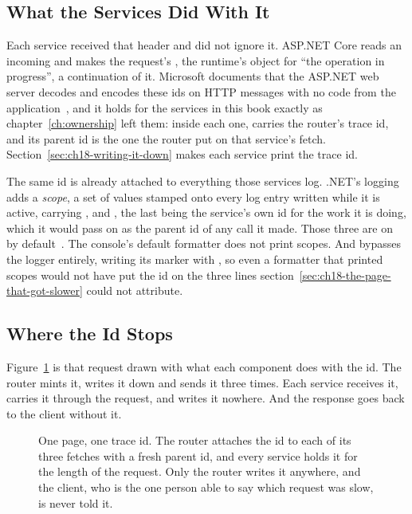 \subsection{What the Services Did With It}

%
%
Each service received that header and did not ignore it. ASP.NET Core reads an
incoming  and makes the request's
, the runtime's object for \enquote{the
operation in progress}, a continuation of it. Microsoft documents that the
ASP.NET web server decodes and encodes these ids on HTTP messages with no
code from the application~\autocite{msdistributedtracing}, and it holds for
the services in this book exactly as chapter~\ref{ch:ownership} left them:
inside each one,  carries the router's trace id, and
its parent id is the one the router put on that service's fetch.
Section~\ref{sec:ch18-writing-it-down} makes each service print the trace id.

%
The same id is already attached to everything those services log. .NET's
logging adds a \emph{scope}, a set of values stamped onto every log entry
written while it is active, carrying ,  and , the last being the
service's own id for the work it is doing, which it would pass on as the
parent id of any call it made. Those three are on by
default~\autocite{msaspnetlogging}.
The console's default formatter does not print scopes. And
 bypasses the logger entirely, writing its marker with
, so even a formatter that printed scopes would not
have put the id on the three lines
section~\ref{sec:ch18-the-page-that-got-slower} could not attribute.

\subsection{Where the Id Stops}

%
Figure~\ref{fig:ch18-one-id-three-fetches} is that request drawn with what
each component does with the id. The router mints it, writes it down and sends
it three times. Each service receives it, carries it through the request, and
writes it nowhere. And the response goes back to the client without it.

\begin{figure}[htbp]
  \centering
  
  \caption{One page, one trace id. The router attaches the id to each of its
  three fetches with a fresh parent id, and every service holds it for the
  length of the request. Only the router writes it anywhere, and the client,
  who is the one person able to say which request was slow, is never told
  it.}
  \label{fig:ch18-one-id-three-fetches}
\end{figure}

